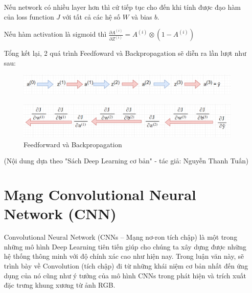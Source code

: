 Nếu network có nhiều layer hơn thì cứ tiếp tục cho đến khi tính được đạo hàm của loss function $J$ với tất cả các hệ số $W$ và bias $b$.

Nếu hàm activation là sigmoid thì $\frac{\partial A^{(i)}}{\partial Z^{(i)}} = A^{(i)} \otimes (1-A^{(i)})$

Tổng kết lại, 2 quá trình Feedfoward và Backpropagation sẽ diễn ra lần lượt như sau:

\FloatBarrier
\begin{figure}[htp]
\begin{center}
\includegraphics[scale=0.7]{chap2/c2_figs/7.png}
\end{center}
\end{figure}
\FloatBarrier

\FloatBarrier
\begin{figure}[htp]
\begin{center}
\includegraphics[scale=0.65]{chap2/c2_figs/8.png}
\end{center}
\caption{Feedforward và Backpropagation}
\label{fig:backpropagation}
\end{figure}
\FloatBarrier

(Nội dung dựa theo "Sách Deep Learning cơ bản" - tác giả: Nguyễn Thanh Tuấn)

\section{Mạng Convolutional Neural Network (CNN)}
Convolutional Neural Network (CNNs – Mạng nơ-ron tích chập) là một trong những mô hình Deep Learning tiên tiến giúp cho chúng ta xây dựng được những hệ thống thông minh với độ chính xác cao như hiện nay. Trong luận văn này, sẽ trình bày về Convolution (tích chập) đi từ những khái niệm cơ bản nhất đến ứng dụng của nó cũng như ý tưởng của mô hình CNNs trong phát hiện và trích xuất đặc trưng khung xương từ ảnh RGB.

